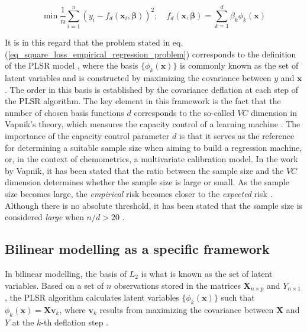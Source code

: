 \documentclass[preprint,12pt]{elsarticle}
\begin{document}
\begin{equation}
    \min \frac{1}{n} \sum_{i=1}^n (y_i-f_d(\mathbf{x}_i, \boldsymbol{\beta}))^2; \quad f_d(\mathbf{x}, \boldsymbol{\beta}) = \sum_{k=1}^{d} \beta_k \phi_{k}(\mathbf{x})
    \label{eq_square_loss_empirical_regression_problem}
\end{equation}

It is in this regard that the problem stated in eq. (\ref{eq_square_loss_empirical_regression_problem}) corresponds to the definition of the PLSR model  \cite{Stone1990}, where the basis $\{\phi_{k}(\mathbf{x})\}$ is commonly known as the set of latent variables and is constructed by maximizing the covariance between $y$ and $\mathbf{x}$. The order in this basis is established by the covariance deflation at each step of the PLSR algorithm. The key element in this framework is the fact that the number of chosen basis functions $d$ corresponds to the so-called $VC$ dimension in Vapnik's theory, which measures the capacity control of a learning machine \cite{Vapnik2019}. The importance of the capacity control parameter $d$ is that it serves as the reference for determining a suitable sample size when aiming to build a regression machine, or, in the context of chemometrics, a multivariate calibration model. In the work by Vapnik, it has been stated that the ratio between the sample size and the $VC$ dimension determines whether the sample size is large or small. As the sample size becomes large, the \emph{empirical} risk becomes closer to the \emph{expected} risk \cite{Vapnik2000}. Although there is no absolute threshold, it has been stated that the sample size is considered \emph{large} when  $n/d>20$ \cite{Vapnik2000}.


\subsection{Bilinear modelling as a specific framework}

In bilinear modelling, the basis of $L_2$ is what is known as the set of latent variables. Based on a set of $n$ observations stored in the matrices $\mathbf{X}_{n\times p}$ and $Y_{n\times 1}$, the PLSR algorithm calculates latent variables $\{\phi_{k}(\mathbf{x})\}$ such that $\phi_k(\mathbf{x}) = \mathbf{Xv}_{k}$, where $\mathbf{v}_k$ results from maximizing the covariance between $\mathbf{X}$ and $Y$ at the $k$-th deflation step \cite{DeJong1993}. 
\end{document}

